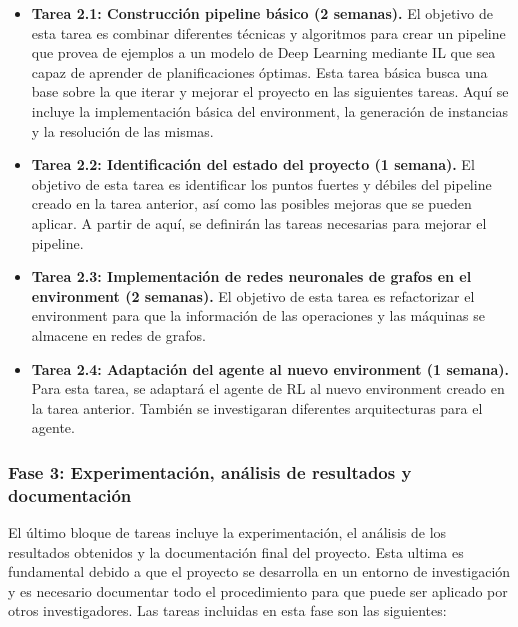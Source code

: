 \begin{itemize}
    \item \textbf{Tarea 2.1: Construcción pipeline básico (2 semanas).} El objetivo de esta tarea es combinar 
    diferentes técnicas y algoritmos para crear un pipeline que provea de ejemplos a un modelo de 
    Deep Learning mediante IL que sea capaz de aprender de planificaciones óptimas. Esta tarea básica busca
    una base sobre la que iterar y mejorar el proyecto en las siguientes tareas. Aquí se incluye la
    implementación básica del environment, la generación de instancias y la resolución de las mismas.
    \item \textbf{Tarea 2.2: Identificación del estado del proyecto (1 semana).} El objetivo de esta tarea es
    identificar los puntos fuertes y débiles del pipeline creado en la tarea anterior, así como
    las posibles mejoras que se pueden aplicar. A partir de aquí, se definirán las tareas
    necesarias para mejorar el pipeline.
    \item \textbf{Tarea 2.3: Implementación de redes neuronales de grafos en el environment (2 semanas).} El 
    objetivo de esta tarea es refactorizar el environment para que la información de las operaciones 
    y las máquinas se almacene en redes de grafos.
    \item \textbf{Tarea 2.4: Adaptación del agente al nuevo environment (1 semana).} Para esta tarea,
    se adaptará el agente de RL al nuevo environment creado en la tarea anterior. También se
    investigaran diferentes arquitecturas para el agente.
\end{itemize}

\subsubsection{Fase 3: Experimentación, análisis de resultados y documentación}
El último bloque de tareas incluye la experimentación, el análisis de los resultados obtenidos y la documentación
final del proyecto. Esta ultima es fundamental debido a que el proyecto se desarrolla en un entorno de investigación
y es necesario documentar todo el procedimiento para que puede ser aplicado por otros investigadores. Las tareas 
incluidas en esta fase son las siguientes:

